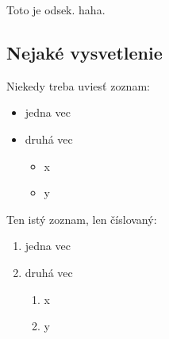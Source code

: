 \documentclass[11pt ,english,a4paper]{article}
\begin{document}
Toto je odsek. haha.

\subsection{Nejaké vysvetlenie} \label{ina:nejake}

Niekedy treba uviesť zoznam:

\begin{itemize}
\item jedna vec
\item druhá vec
	\begin{itemize}
	\item x
	\item y
	\end{itemize}
\end{itemize}

Ten istý zoznam, len číslovaný:

\begin{enumerate}
\item jedna vec
\item druhá vec
	\begin{enumerate}
	\item x
	\item y
	\end{enumerate}
\end{enumerate}



\end{document}
